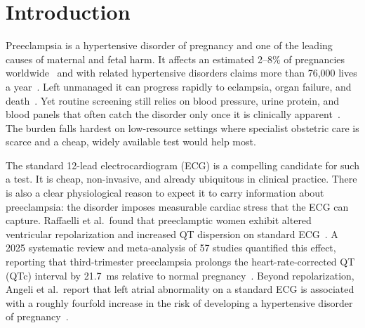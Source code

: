 \documentclass[sigconf,nonacm]{acmart}
\begin{document}
\maketitle

\section{Introduction}
\label{sec:intro}

Preeclampsia is a hypertensive disorder of pregnancy and one of the leading
causes of maternal and fetal harm. It affects an estimated 2--8\% of
pregnancies worldwide~\cite{ozcan_preeclampsia_2025} and with related
hypertensive disorders claims more than 76,000 lives a
year~\cite{butler_ai-based_2024}. Left unmanaged it can progress rapidly to
eclampsia, organ failure, and death~\cite{mayo_clinic_preeclampsia_nodate}. Yet routine screening still relies on
blood pressure, urine protein, and blood panels that often catch the disorder
only once it is clinically apparent~\cite{noauthor_preeclampsia_2018}. The
burden falls hardest on low-resource settings where specialist obstetric care
is scarce and a cheap, widely available test would help most.

The standard 12-lead electrocardiogram (ECG) is a compelling candidate
for such a test. It is cheap, non-invasive, and already ubiquitous in
clinical practice. There is also a clear physiological reason to expect it
to carry information about preeclampsia: the disorder imposes measurable
cardiac stress that the ECG can capture. Raffaelli et al.\ found that
preeclamptic women exhibit altered ventricular repolarization and
increased QT dispersion on standard
ECG~\cite{raffaelli_pre-eclampsia_2014}. A 2025 systematic review and
meta-analysis of 57 studies quantified this effect, reporting that
third-trimester preeclampsia prolongs the heart-rate-corrected QT (QTc)
interval by 21.7~ms relative to normal
pregnancy~\cite{aboshady_qtc_2025}. Beyond repolarization, Angeli et al.\
report that left atrial abnormality on a standard ECG is associated with
a roughly fourfold increase in the risk of developing a hypertensive
disorder of pregnancy~\cite{angeli_novel_2015}.
\end{document}
